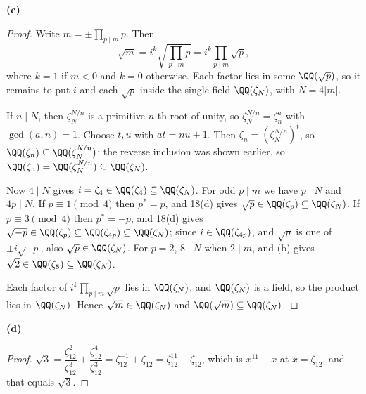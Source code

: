 \documentclass[11pt]{article}
\begin{document}
\noindent\textbf{(c)}
\begin{proof}
Write $m=\pm\prod_{p\mid m}p$. Then
\[
\sqrt m=i^{k}\sqrt{\prod_{p\mid m}p}=i^{k}\prod_{p\mid m}\sqrt p,
\]
where $k=1$ if $m<0$ and $k=0$ otherwise. Each factor lies in some $\QQ(\sqrt p)$, so it remains to put $i$ and each $\sqrt p$ inside the single field $\QQ(\zeta_N)$, with $N=4|m|$.

If $n\mid N$, then $\zeta_N^{N/n}$ is a primitive $n$-th root of unity, so $\zeta_N^{N/n}=\zeta_n^{a}$ with $\gcd(a,n)=1$. Choose $t,u$ with $at=nu+1$. Then $\zeta_n=(\zeta_N^{N/n})^{t}$, so $\QQ(\zeta_n)\subseteq\QQ(\zeta_N^{N/n})$; the reverse inclusion was shown earlier, so $\QQ(\zeta_n)=\QQ(\zeta_N^{N/n})\subseteq\QQ(\zeta_N)$.

Now $4\mid N$ gives $i=\zeta_4\in\QQ(\zeta_4)\subseteq\QQ(\zeta_N)$. For odd $p\mid m$ we have $p\mid N$ and $4p\mid N$. If $p\equiv1\pmod4$ then $p^{*}=p$, and 18(d) gives $\sqrt p\in\QQ(\zeta_p)\subseteq\QQ(\zeta_N)$. If $p\equiv3\pmod4$ then $p^{*}=-p$, and 18(d) gives $\sqrt{-p}\in\QQ(\zeta_p)\subseteq\QQ(\zeta_{4p})\subseteq\QQ(\zeta_N)$; since $i\in\QQ(\zeta_{4p})$, and $\sqrt p$ is one of $\pm i\sqrt{-p}$, also $\sqrt p\in\QQ(\zeta_N)$. For $p=2$, $8\mid N$ when $2\mid m$, and (b) gives $\sqrt2\in\QQ(\zeta_8)\subseteq\QQ(\zeta_N)$.

Each factor of $i^{k}\prod_{p\mid m}\sqrt p$ lies in $\QQ(\zeta_N)$, and $\QQ(\zeta_N)$ is a field, so the product lies in $\QQ(\zeta_N)$. Hence $\sqrt m\in\QQ(\zeta_N)$ and $\QQ(\sqrt m)\subseteq\QQ(\zeta_N)$.
\end{proof}
\noindent\textbf{(d)}
\begin{proof}
$\sqrt3=\dfrac{\zeta_{12}^{2}}{\zeta_{12}^{3}}+\dfrac{\zeta_{12}^{4}}{\zeta_{12}^{3}}=\zeta_{12}^{-1}+\zeta_{12}=\zeta_{12}^{11}+\zeta_{12}$, which is $x^{11}+x$ at $x=\zeta_{12}$, and that equals $\sqrt3$.
\end{proof}
\end{document}
